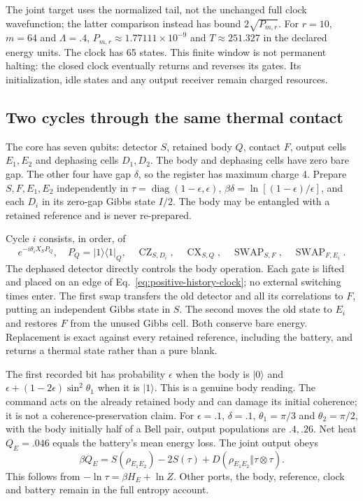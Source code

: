 The joint target uses the normalized tail, not the unchanged full clock
wavefunction; the latter comparison instead has bound $2\sqrt{P_{m,r}}$.
For $r=10$, $m=64$ and $\Lambda=.4$,
$P_{m,r}\approx1.77111\times10^{-9}$ and $T\approx251.327$ in the declared energy units.
The clock has 65 states. This finite window is not permanent halting:
the closed clock eventually returns and reverses its gates. Its initialization,
idle states and any output receiver remain charged resources.

\subsection{Two cycles through the same thermal contact}

The core has seven qubits: detector $S$, retained body $Q$, contact $F$,
output cells $E_1,E_2$ and dephasing cells $D_1,D_2$. The body and dephasing
cells have zero bare gap. The other four have gap $\delta$, so the register
has maximum charge 4. Prepare $S,F,E_1,E_2$ independently in
$\tau=\operatorname{diag}(1-\epsilon,\epsilon)$,
$\beta\delta=\ln[(1-\epsilon)/\epsilon]$, and each $D_i$ in its
zero-gap Gibbs state $I/2$. The body may be entangled with a retained
reference and is never re-prepared.

Cycle $i$ consists, in order, of
\[
 e^{-i\theta_i X_S P_Q},\quad P_Q=|1\rangle\langle1|_Q,\quad
 \operatorname{CZ}_{S,D_i},\quad
 \operatorname{CX}_{S,Q},\quad
 \operatorname{SWAP}_{S,F},\quad
 \operatorname{SWAP}_{F,E_i}.
\]
The dephased detector directly controls the body operation. Each gate is
lifted and placed on an edge of Eq.~\eqref{eq:positive-history-clock};
no external switching times enter. The first swap transfers the old
detector and all its correlations to $F$, putting an independent Gibbs
state in $S$. The second moves the old state to $E_i$ and restores $F$
from the unused Gibbs cell. Both conserve bare energy. Replacement is exact
against every retained reference, including the battery, and returns a
thermal state rather than a pure blank.

The first recorded bit has probability $\epsilon$ when the body is $|0\rangle$
and $\epsilon+(1-2\epsilon)\sin^2\theta_1$ when it is $|1\rangle$.
This is a genuine body reading. The command acts on the already retained
body and can damage its initial coherence; it is not a coherence-preservation claim.
For $\epsilon=.1$, $\delta=.1$, $\theta_1=\pi/3$ and $\theta_2=\pi/2$,
with the body initially half of a Bell pair, output populations are $.4,.26$.
Net heat $Q_E=.046$ equals the battery's mean energy loss. The joint output obeys
\begin{equation}\label{eq:core-output-heat}
 \beta Q_E=S(\rho_{E_1E_2})-2S(\tau)
       +D(\rho_{E_1E_2}\Vert\tau\otimes\tau).
\end{equation}
This follows from $-\ln\tau=\beta H_E+\ln Z$. Other ports, the body,
reference, clock and battery remain in the full entropy account.

